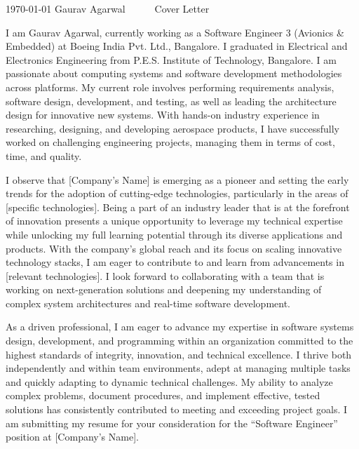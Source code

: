 \documentclass[12pt, a4paper]{awesome-cv}
\begin{document}
\makecvheader[R]

\makecvfooter
  {\today}
  {Gaurav Agarwal~~~\cdotp~~~Cover Letter}
  {}

\makelettertitle

\begin{cvletter}


I am Gaurav Agarwal, currently working as a Software Engineer 3 (Avionics \& Embedded) at Boeing India Pvt. Ltd., Bangalore. I graduated in Electrical and Electronics Engineering from P.E.S. Institute of Technology, Bangalore. I am passionate about computing systems and software development methodologies across platforms. My current role involves performing requirements analysis, software design, development, and testing, as well as leading the architecture design for innovative new systems. With hands-on industry experience in researching, designing, and developing aerospace products, I have successfully worked on challenging engineering projects, managing them in terms of cost, time, and quality.


I observe that [Company's Name] is emerging as a pioneer and setting the early trends for the adoption of cutting-edge technologies, particularly in the areas of [specific technologies]. Being a part of an industry leader that is at the forefront of innovation presents a unique opportunity to leverage my technical expertise while unlocking my full learning potential through its diverse applications and products. With the company's global reach and its focus on scaling innovative technology stacks, I am eager to contribute to and learn from advancements in [relevant technologies]. I look forward to collaborating with a team that is working on next-generation solutions and deepening my understanding of complex system architectures and real-time software development.


As a driven professional, I am eager to advance my expertise in software systems design, development, and programming within an organization committed to the highest standards of integrity, innovation, and technical excellence. I thrive both independently and within team environments, adept at managing multiple tasks and quickly adapting to dynamic technical challenges. My ability to analyze complex problems, document procedures, and implement effective, tested solutions has consistently contributed to meeting and exceeding project goals. I am submitting my resume for your consideration for the ``Software Engineer'' position at [Company's Name].

\end{cvletter}

\makeletterclosing
\end{document}
